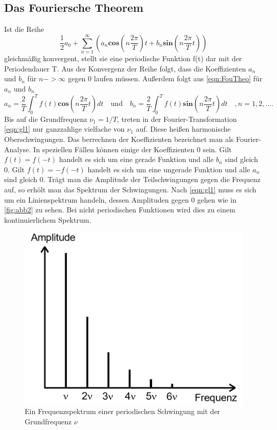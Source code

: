 \subsection{Das Fouriersche Theorem}
\label{sec:Fouriersche Theorem}
Ist die Reihe
\begin{equation}
  \frac{1}{2} a_0 + \sum_{n = 1}^{\infty} \left( a_n \symbf{cos} (n \frac{2 \pi}{T} )t + b_n \symbf{sin} (n \frac{2 \pi}{T} t) \right) 
  \label{eqn:gl1}
\end{equation}
gleichmäßig konvergent, stellt sie eine periodische Funktion f(t) dar mit der Periodendauer T.
Aus der Konvergenz der Reihe folgt, dass die Koeffizienten $a_n$ und $b_n$ für $n -> \infty$ gegen 0 laufen müssen.
Außerdem folgt aus \ref{eqn:FouTheo} für $a_n$ und $b_n$
\begin{equation}
  a_n = \frac{2}{T} \int_0^T f(t) \symbf{cos} (n \frac{2 \pi}{T} t) dt \quad
  \textrm{und} \quad
  b_n = \frac{2}{T} \int_0^T f(t) \symbf{sin} (n \frac{2 \pi}{T} t) dt \quad
  ,n= 1, 2, .... 
  \label{eqn:gl2}
\end{equation}
Bis auf die Grundfrequenz $\nu_1 = 1/T$, treten in der Fourier-Transformation \ref{eqn:gl1} nur ganzzahlige vielfache von $\nu_1$ auf.
Diese heißen harmonische Oberschwingungen.
Das berrechnen der Koeffizienten bezeichnet man als Fourier-Analyse.
In speziellen Fällen können einige der Koeffizienten 0 sein. 
Gilt $f(t) = f(-t)$ handelt es sich um eine gerade Funktion und alle $b_n$ sind gleich 0.
Gilt $f(t) = -f(-t)$ handelt es sich um eine ungerade Funktion und alle $a_n$ sind gleich 0.
Trägt man die Amplitude der Teilschwingungen gegen die Frequenz auf, so erhölt man das Spektrum der Schwingungen.
Nach \ref{eqn:gl1} muss es sich um ein Linienspektrum handeln, dessen Amplituden gegen 0 gehen wie in \ref{fig:abb2} zu sehen.
Bei nicht periodischen Funktionen wird dies zu einem kontinuierlichem Spektrum.
\begin{figure}
  \centering
  \includegraphics[width=\textwidth]{abb1.jpg}
  \caption{Ein Frequenzspektrum einer periodischen Schwingung mit der Grundfrequenz $\nu$}
  \label{fig:abb1}
\end{figure}

